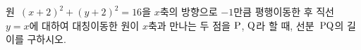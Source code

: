 원~$(x+2)^2+(y+2)^2=16$을 $x$축의 방향으로 $-1$만큼 평행이동한 후 직선~$y=x$에 대하여 대칭이동한 원이 $x$축과 만나는 두 점을 $\mathrm{P}$, $\mathrm{Q}$라 할 때, 선분~$\mathrm{PQ}$의 길이를 구하시오.
